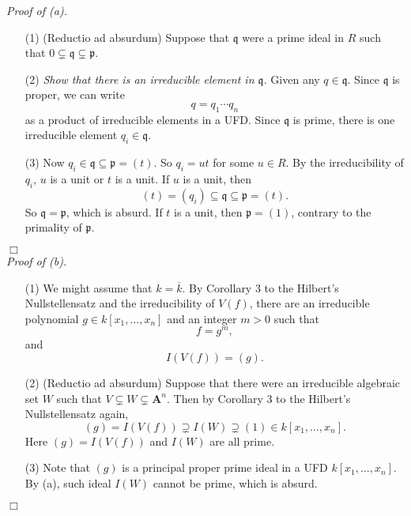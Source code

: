 \documentclass{article}
\begin{document}
\emph{Proof of (a).}
\begin{enumerate}
\item[(1)]
  (Reductio ad absurdum)
  Suppose that $\mathfrak{q}$ were a prime ideal in $R$ such that
  $0 \subsetneq \mathfrak{q} \subsetneq \mathfrak{p}$.

\item[(2)]
  \emph{Show that there is an irreducible element in $\mathfrak{q}$.}
  Given any $q \in \mathfrak{q}$. Since $\mathfrak{q}$ is proper,
  we can write
  \[
    q = q_1 \cdots q_n
  \]
  as a product of irreducible elements in a UFD.
  Since $\mathfrak{q}$ is prime, there is one irreducible element $q_i \in \mathfrak{q}$.

\item[(3)]
  Now $q_i \in \mathfrak{q} \subseteq \mathfrak{p} = (t)$.
  So $q_i = ut$ for some $u \in R$.
  By the irreducibility of $q_i$, $u$ is a unit or $t$ is a unit.
  If $u$ is a unit, then
  \[
    (t) = (q_i) \subseteq \mathfrak{q} \subseteq \mathfrak{p} = (t).
  \]
  So $\mathfrak{q} = \mathfrak{p}$, which is absurd.
  If $t$ is a unit, then $\mathfrak{p} = (1)$, contrary to the primality of $\mathfrak{p}$.
\end{enumerate}
$\Box$ \\



\emph{Proof of (b).}
\begin{enumerate}
\item[(1)]
  We might assume that $k = \overline{k}$.
  By Corollary 3 to the Hilbert's Nullstellensatz and the irreducibility of $V(f)$,
  there are an irreducible polynomial $g \in k[x_1,\ldots,x_n]$ and an integer $m > 0$
  such that
  \[
    f = g^m,
  \]
  and
  \[
    I(V(f)) = (g).
  \]

\item[(2)]
  (Reductio ad absurdum)
  Suppose that there were an irreducible algebraic set $W$ such that
  $V \subsetneq W \subsetneq \mathbf{A}^n$.
  Then by Corollary 3 to the Hilbert's Nullstellensatz again,
  \[
    (g) = I(V(f)) \supsetneq I(W) \supsetneq (1) \in k[x_1,\ldots,x_n].
  \]
  Here $(g) = I(V(f))$ and $I(W)$ are all prime.

\item[(3)]
  Note that $(g)$ is a principal proper prime ideal in a UFD $k[x_1,\ldots,x_n]$.
  By (a), such ideal $I(W)$ cannot be prime, which is absurd.
\end{enumerate}
$\Box$ \\\\
\end{document}
